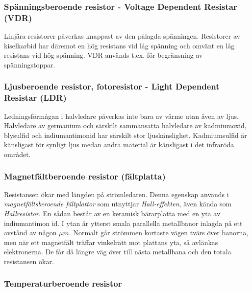 \subsubsection{Spänningsberoende resistor - Voltage Dependent Resistar (VDR)}

Linjära resistorer påverkas knappast av den pålagda spänningen. Resistorer av
kiselkarbid har däremot en hög resistans vid låg spänning och omvänt en låg
resistans vid hög spänning. VDR används t.ex. för begränsning av
spänningstoppar.

\subsubsection{Ljusberoende resistor, fotoresistor - Light Dependent Resistar (LDR)}

Ledningsförmågan i halvledare påverkas inte bara av värme utan även av ljus.
Halvledare av germanium och särskilt sammansatta halvledare av kadmiumoxid,
blysulfid och indiumantimonid har särskilt stor ljuskänslighet. Kadmiumsulfid
är känsligast för synligt ljus medan andra material är känsligast i det
infraröda området.

\subsubsection{Magnetfältberoende resistor (fältplatta)}

Resistansen ökar med längden på strömledaren. Denna egenskap används i
\emph{magnetfältsberoende fältplattor} som utnyttjar \emph{Hall-effekten}, även
kända som \emph{Hallresistor}. En sådan består av en keramisk bärarplatta med
en yta av indiumantimon id. I ytan är ytterst smala parallella metallbanor
inlagda på ett avstånd av någon \(\mu m\). Normalt går strömmen kortaste vägen
tvärs över banorna, men när ett magnetfält träffar vinkelrätt mot plattans yta,
så avlänkas elektronerna. De får då längre väg över till nästa metallbana och
den totala resistansen ökar.

\subsubsection{Temperaturberoende resistor}

